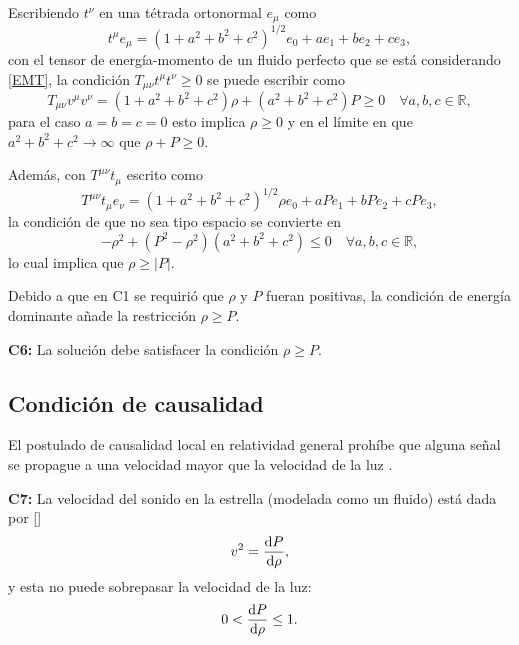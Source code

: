 Escribiendo $t^\nu$ en una tétrada ortonormal $e_{\mu}$ como
\begin{equation}
    t^{\mu} e_{\mu}= \left(1+a^{2}+b^{2}+c^{2}\right)^{1 / 2} e_{0}+a e_{1}+b e_{2}+c e_{3},
\end{equation}
con el tensor de energía-momento de un fluido perfecto que se está considerando \eqref{EMT}, la condición $T_{\mu \nu} t^{\mu} t^{\nu} \geq 0$ se puede escribir como
\begin{equation}
T_{\mu \nu} v^{\mu} v^{\nu}=\left(1+a^{2}+b^{2}+c^{2}\right) \rho + \left( a^{2} +b^{2} +c^{2} \right) P \geq 0 \quad \forall a,b,c \in \mathbb{R},
\end{equation}
para el caso $a=b=c=0$ esto implica $\rho \geq 0$ y en el límite en que $a^2+b^2+c^2 \to \infty$ que $\rho + P \geq 0$.

Además, con $T^{\mu \nu} t_{\mu}$ escrito como
\begin{equation}
T^{\mu \nu} t_{\mu}e_{\nu}=\left(1+a^{2}+b^{2}+c^{2}\right)^{1 / 2} \rho e_{0}+a P e_{1}+b P e_{2}+c P e_{3},
\end{equation}
la condición de que no sea tipo espacio se convierte en
\begin{equation}
    -\rho^2 + (P^2-\rho^2)(a^2+b^2+c^2) \leq 0 \quad \forall a,b,c \in \mathbb{R},
\end{equation}
lo cual implica que $\rho \geq |P|$.

Debido a que en C1 se requirió que $\rho$ y $P$ fueran positivas, la condición de energía dominante añade la restricción $\rho \geq P$.

\textbf{C6:} La solución debe satisfacer la condición $\rho \geq P$.

\subsection*{Condición de causalidad}
El postulado de causalidad local en relatividad general prohíbe que alguna señal se propague a una velocidad mayor que la velocidad de la luz \cite{Hawking1973TheSpaceTime}. 

\textbf{C7:}  La velocidad del sonido en la estrella (modelada como un fluido) está dada por []
\begin{equation}
    v^2=\dv{P}{\rho},
\end{equation}
y esta no puede sobrepasar la velocidad de la luz:
\begin{equation}
    0 < \dv{P}{\rho} \leq 1 .
\end{equation}

